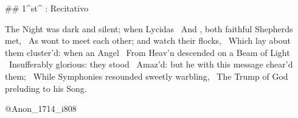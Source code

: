 \newpage
{}

## 1^st^ \mvmt: Recitativo

\beginnumbering
\pstart
The Night was dark and silent; when Lycidas  \
And , both faithful Shepherds met,  \
As wont to meet each other; and watch their flocks,  \
Which lay about them cluster’d: when an Angel  \
From Heav’n descended on a Beam of Light  \
Insufferably glorious: they stood  \
Amaz’d: but he with this message chear’d them;  \
While Symphonies resounded sweetly warbling,  \
The Trump of God preluding to his Song.
\pend
\endnumbering

\vspace*{\stretch{1}}
@Anon_1714_i808
